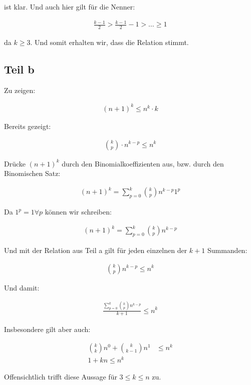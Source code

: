 \documentclass[a4paper,german,12pt,smallheadings]{scrartcl}
\begin{document}
ist klar. Und auch hier gilt für die Nenner:

\begin{align*}
  \frac{k-1}{2} > \frac{k-1}{2} -1 > \dots \ge 1
\end{align*}

da $k \ge 3$. Und somit erhalten wir, dass die Relation stimmt.

\subsection*{Teil b}

Zu zeigen:

\begin{align*}
  (n+1)^k \le n^k \cdot k
\end{align*}

Bereits gezeigt:

\begin{align*}
  {k \choose p} \cdot n^{k-p} \le n^k
\end{align*}

Drücke $(n+1)^k$ durch den Binomialkoeffizienten aus, bzw. durch den Binomischen Satz:

\begin{align*}
  (n+1)^k = \sum_{p=0}^k {k \choose p} n^{k-p} 1^p
\end{align*}

Da $1^p = 1 \forall p$ können wir schreiben:

\begin{align*}
  (n+1)^k = \sum_{p=0}^k {k \choose p} n^{k-p}
\end{align*}

Und mit der Relation aus Teil a gilt für jeden einzelnen der $k+1$ Summanden:

\begin{align*}
  {k \choose p} n^{k-p} \le n^k
\end{align*}

Und damit:

\begin{align*}
  \frac{\sum_{p=0}^k {k \choose p} n^{k-p}}{k+1} \le n^k
\end{align*}

Insbesondere gilt aber auch:

\begin{align*}
  {k \choose k} n^0 + {k \choose k-1}n^1 &\le n^k \\
  1 + kn \le n^k
\end{align*}

Offensichtlich trifft diese Aussage für $3 \le k \le n$ zu.
\end{document}
